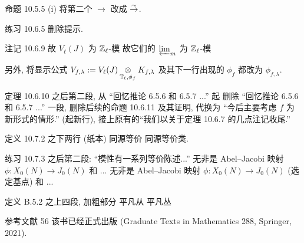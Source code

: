 \documentclass{AJerrata}
\begin{document}
\begin{Errata}
		\item[命题 10.5.5 (i)]
		将第二个 $\to$ 改成 $\stackrel{\sim}{\rightarrow}$.
		
		\item[练习 10.6.5]
		删除提示.
		
		\item[注记 10.6.9]
		\Orig 故 $V_\ell(J)$ 为 $\mathbb{Z}_\ell$-模
		\Corr 故它们的 $\varprojlim_m$ 为 $\mathbb{Z}_\ell$-模
		
		另外, 将显示公式 $V_{f, \lambda} := V_\ell(J) \underset{\mathbb{T}_\ell, \phi_f}{\otimes} K_{f, \lambda}$ 及其下一行出现的 $\phi_f$ 都改为 $\phi_{f, \lambda}$.
		
		\item[定理 10.6.10 之后第二段, 从 ``回忆推论 6.5.6 和 6.5.7 ...'' 起]
		删除 ``回忆推论 6.5.6 和 6.5.7 ...'' 一段, 删除后续的命题 10.6.11 及其证明, 代换为 ``今后主要考虑 $f$ 为新形式的情形.'' (起新行), 接上原有的``我们以关于定理 10.6.7 的几点注记收尾.''
		
		\item[定义 10.7.2 之下两行 (纸本)]
		\Orig 同源等价
		\Corr 同源等价类.
		
		\item[练习 10.7.3 之后第二段: ``模性有一系列等价陈述...'']
		\Orig 无非是 Abel--Jacobi 映射 $\phi: X_0(N) \to J_0(N)$ 和 ...
		\Corr 无非是 Abel--Jacobi 映射 $\phi: X_0(N) \to J_0(N)$ (选定基点) 和 ...
		
		\item[定义 B.5.2 之上四段, 加粗部分]
		\Orig 平凡从
		\Corr 平凡丛
		
		\item[参考文献 56] 该书已经正式出版 (Graduate Texts in Mathematics 288, Springer, 2021).
	\end{Errata}
\end{document}

